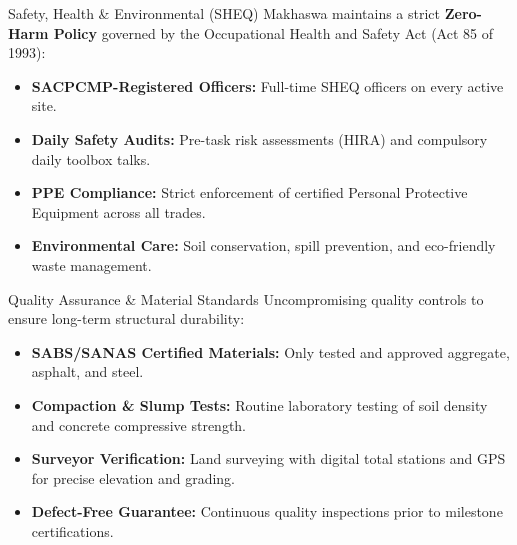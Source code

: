 \documentclass[a4paper,11pt]{article}
\begin{document}
\vspace{0.5cm}

\noindent
\begin{minipage}[t]{0.485\textwidth}
    \begin{brandcard}{Safety, Health \& Environmental (SHEQ)}
        Makhaswa maintains a strict \textbf{Zero-Harm Policy} governed by the Occupational Health and Safety Act (Act 85 of 1993):

        \begin{itemize}[leftmargin=12pt, itemsep=3.5pt, label=\color{mhblue}$\blacktriangleright$]
            \item \textbf{SACPCMP-Registered Officers:} Full-time SHEQ officers on every active site.
            \item \textbf{Daily Safety Audits:} Pre-task risk assessments (HIRA) and compulsory daily toolbox talks.
            \item \textbf{PPE Compliance:} Strict enforcement of certified Personal Protective Equipment across all trades.
            \item \textbf{Environmental Care:} Soil conservation, spill prevention, and eco-friendly waste management.
        \end{itemize}
    \end{brandcard}
\end{minipage}
\hfill
\begin{minipage}[t]{0.485\textwidth}
    \begin{brandcard}{Quality Assurance \& Material Standards}
        Uncompromising quality controls to ensure long-term structural durability:

        \begin{itemize}[leftmargin=12pt, itemsep=3.5pt, label=\color{mhblue}$\blacktriangleright$]
            \item \textbf{SABS/SANAS Certified Materials:} Only tested and approved aggregate, asphalt, and steel.
            \item \textbf{Compaction \& Slump Tests:} Routine laboratory testing of soil density and concrete compressive strength.
            \item \textbf{Surveyor Verification:} Land surveying with digital total stations and GPS for precise elevation and grading.
            \item \textbf{Defect-Free Guarantee:} Continuous quality inspections prior to milestone certifications.
        \end{itemize}
    \end{brandcard}
\end{minipage}
\end{document}
